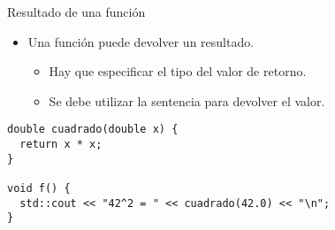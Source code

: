 \begin{frame}[t,fragile]{Resultado de una función}
\begin{itemize}
  \item Una función puede devolver un resultado.
    \begin{itemize}
      \item Hay que especificar el tipo del valor de retorno.
      \item Se debe utilizar la sentencia  para devolver el valor.
    \end{itemize}
\end{itemize}

\begin{lstlisting}
double cuadrado(double x) {
  return x * x;
}

void f() {
  std::cout << "42^2 = " << cuadrado(42.0) << "\n";
}
\end{lstlisting}
\end{frame}
